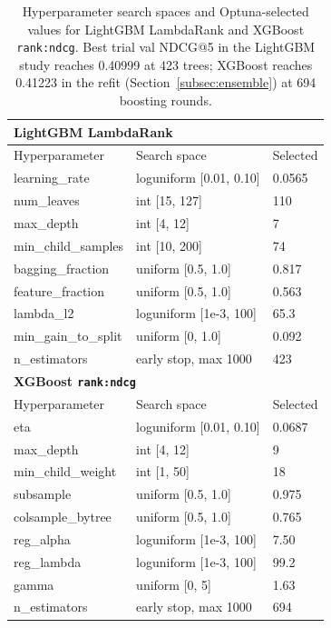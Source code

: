\documentclass[runningheads]{llncs}
\begin{document}
\begin{table}[t]
\centering
\caption{Hyperparameter search spaces and Optuna-selected values for LightGBM LambdaRank and XGBoost \texttt{rank:ndcg}. Best trial val NDCG@5 in the LightGBM study reaches 0.40999 at 423 trees; XGBoost reaches 0.41223 in the refit (Section~\ref{subsec:ensemble}) at 694 boosting rounds.}
\label{tab:hyper}
\begin{tabular}{lll}
\toprule
\multicolumn{3}{l}{\textbf{LightGBM LambdaRank}} \\
\midrule
Hyperparameter & Search space & Selected \\
\midrule
learning\_rate & loguniform [0.01, 0.10] & 0.0565 \\
num\_leaves & int [15, 127] & 110 \\
max\_depth & int [4, 12] & 7 \\
min\_child\_samples & int [10, 200] & 74 \\
bagging\_fraction & uniform [0.5, 1.0] & 0.817 \\
feature\_fraction & uniform [0.5, 1.0] & 0.563 \\
lambda\_l2 & loguniform [1e-3, 100] & 65.3 \\
min\_gain\_to\_split & uniform [0, 1.0] & 0.092 \\
n\_estimators & early stop, max 1000 & 423 \\
\midrule
\multicolumn{3}{l}{\textbf{XGBoost \texttt{rank:ndcg}}} \\
\midrule
Hyperparameter & Search space & Selected \\
\midrule
eta & loguniform [0.01, 0.10] & 0.0687 \\
max\_depth & int [4, 12] & 9 \\
min\_child\_weight & int [1, 50] & 18 \\
subsample & uniform [0.5, 1.0] & 0.975 \\
colsample\_bytree & uniform [0.5, 1.0] & 0.765 \\
reg\_alpha & loguniform [1e-3, 100] & 7.50 \\
reg\_lambda & loguniform [1e-3, 100] & 99.2 \\
gamma & uniform [0, 5] & 1.63 \\
n\_estimators & early stop, max 1000 & 694 \\
\bottomrule
\end{tabular}
\end{table}
\end{document}
